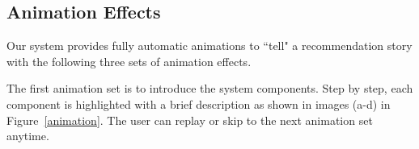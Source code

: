 \documentclass{vgtc}                          %
\begin{document}
\begin{figure*}[htb]
\caption{Example snapshots of the storytelling animation. 
We start by introducing the system interface to a new user, such as the use of rating history (a), color code (b), recommendation degree (c) and the liked zone (d).
We also use example movies to illustrate the latent dimension and attract user attention with poster transitions (e-h).
Next, we introduce the first recommended movie by animating the movie node and showing a green line under its poster (i).
The visualization domain is animated from level one (i), level two (j-k), to level three (l-m) gradually.
The same procedure (i-m) is used to animate the second (n) to the last (o) recommended movies respectively.
}



\label{animation}
\end{figure*} 





\subsection{Animation Effects}

Our system provides fully automatic animations to ``tell" a recommendation story with the following three sets of animation effects.

The first animation set is to introduce the system components. 
Step by step, each component is highlighted with a brief description as shown in images (a-d) in Figure~\ref{animation}. 
The user can replay or skip to the next animation set anytime.
 
\end{document}
